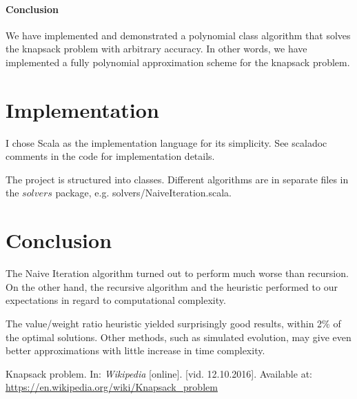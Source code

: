 \documentclass[a4paper,10pt,twocolumn]{article}
\begin{document}
\paragraph{Conclusion} We have implemented and demonstrated a polynomial class algorithm that solves the knapsack
problem with arbitrary accuracy. In other words, we have implemented a fully polynomial approximation scheme for the
knapsack problem.

\section{Implementation} %
I chose Scala as the implementation language for its simplicity. See scaladoc comments in the code for implementation
details.

The project is structured into classes. Different algorithms are in separate files in the $solvers$ package, e.g.
solvers/NaiveIteration.scala.

\section{Conclusion} %
The Naive Iteration algorithm turned out to perform much worse than recursion. On the other hand, the recursive
algorithm and the heuristic performed to our expectations in regard to computational complexity.

The value/weight ratio heuristic yielded surprisingly good results, within 2\% of the optimal solutions. Other methods,
such as simulated evolution, may give even better approximations with little increase in time complexity.

\begin{thebibliography}{9}
        Knapsack problem.
        In: \textit {Wikipedia} [online].
        [vid. 12.10.2016]. Available at:
        \url{https://en.wikipedia.org/wiki/Knapsack_problem}
\end{thebibliography}
\end{document}
